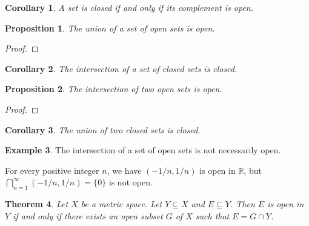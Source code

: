 \documentclass{book}
\let\qed\relax
\newtheorem{prop}{Proposition}[chapter]
\newtheorem{cor}{Corollary}[prop]
\newtheorem{thm}[prop]{Theorem}
\theoremstyle{definition}
\newtheorem{ex}[prop]{Example}
\begin{document}
\begin{cor}
A set is closed if and only if its complement is open.
\end{cor}

\begin{prop}
\label{prop:union_open}
The union of a set of open sets is open.
\end{prop}

\begin{proof}
\pf
{}
\qed
\end{proof}

\begin{cor}
The intersection of a set of closed sets is closed.
\end{cor}

\begin{prop}
The intersection of two open sets is open.
\end{prop}

\begin{proof}
\pf
{}
\qed
\end{proof}

\begin{cor}
The union of two closed sets is closed.
\end{cor}

\begin{ex}
The intersection of a set of open sets is not necessarily open.

For every positive integer $n$, we have $(-1/n,1/n)$ is open in $\mathbb{R}$, but $\bigcap_{n=1}^\infty (-1/n,1/n) = \{0\}$ is not open.
\end{ex}

\begin{thm}
Let $X$ be a metric space. Let $Y \subseteq X$ and $E \subseteq Y$. Then $E$ is open in $Y$ if and only if there exists an open subset $G$ of $X$ such that $E = G \cap Y$.
\end{thm}
\end{document}
